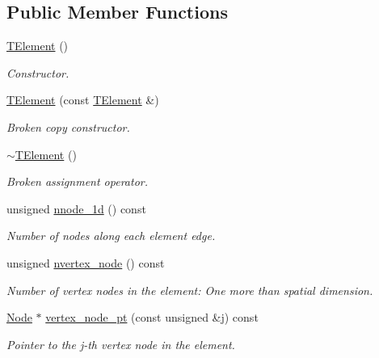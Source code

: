 \subsection*{Public Member Functions}
\begin{DoxyCompactItemize}
\item 
\hyperlink{classoomph_1_1TElement_3_011_00_01NNODE__1D_01_4_a4f2cbb79c20b6540c1a55e49106f2b0a}{T\+Element} ()
\begin{DoxyCompactList}\small\item\em Constructor. \end{DoxyCompactList}\item 
\hyperlink{classoomph_1_1TElement_3_011_00_01NNODE__1D_01_4_a668a7e0412744a66e54906c58cdc4414}{T\+Element} (const \hyperlink{classoomph_1_1TElement}{T\+Element} \&)
\begin{DoxyCompactList}\small\item\em Broken copy constructor. \end{DoxyCompactList}\item 
\hyperlink{classoomph_1_1TElement_3_011_00_01NNODE__1D_01_4_a69904e4a550fc1010358bbd358163dd2}{$\sim$\+T\+Element} ()
\begin{DoxyCompactList}\small\item\em Broken assignment operator. \end{DoxyCompactList}\item 
unsigned \hyperlink{classoomph_1_1TElement_3_011_00_01NNODE__1D_01_4_aa4a51ef7a9db55eabf35f0a00cc00a87}{nnode\+\_\+1d} () const
\begin{DoxyCompactList}\small\item\em Number of nodes along each element edge. \end{DoxyCompactList}\item 
unsigned \hyperlink{classoomph_1_1TElement_3_011_00_01NNODE__1D_01_4_a3867e214d40e774ddfe31041b21d84c8}{nvertex\+\_\+node} () const
\begin{DoxyCompactList}\small\item\em Number of vertex nodes in the element\+: One more than spatial dimension. \end{DoxyCompactList}\item 
\hyperlink{classoomph_1_1Node}{Node} $\ast$ \hyperlink{classoomph_1_1TElement_3_011_00_01NNODE__1D_01_4_af3470dfe32af9593a1a1dd19c2f282a3}{vertex\+\_\+node\+\_\+pt} (const unsigned \&j) const
\begin{DoxyCompactList}\small\item\em Pointer to the j-\/th vertex node in the element. \end{DoxyCompactList}\item 

\end{DoxyCompactItemize}

